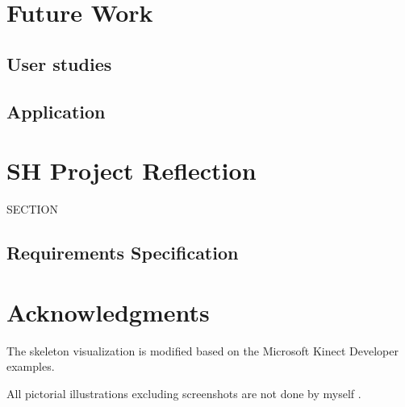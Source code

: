 \documentclass{sigchi}
\begin{document}
\section{Future Work}

\subsection{User studies}

\subsection{Application}

\section{SH Project Reflection}

SECTION

\subsection{Requirements Specification}

\section{Acknowledgments}

The skeleton visualization is modified based on the Microsoft Kinect Developer examples.

All pictorial illustrations excluding screenshots are not done by myself
.
%
%
%
%
%
\balance{}



\end{document}
